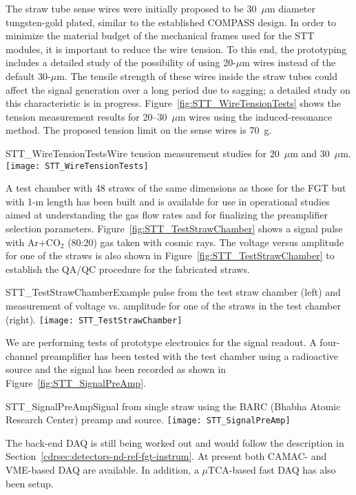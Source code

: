 The straw tube sense wires were initially proposed to be
30~$\mu$m diameter tungsten-gold plated, similar to the established
COMPASS design. In order to minimize the material
budget of the mechanical frames used for the STT modules, it is
important to reduce the wire tension. To this end, the prototyping
includes a detailed study of the possibility of using 20-$\mu$m wires
instead of the default 30-$\mu$m. The tensile strength of these wires
inside the straw tubes could affect the signal generation over a long
period due to sagging; a detailed study on this characteristic is in progress. 
Figure~\ref{fig:STT_WireTensionTests} shows the
tension measurement results for 20--30~$\mu$m wires using the induced-resonance method.  
The proposed tension limit on the sense wires is
70~g.
\begin{cdrfigure}
{STT_WireTensionTests}{Wire tension measurement studies for 20~$\mu$m and 30~$\mu$m.}
\texttt{[image: STT\_WireTensionTests]}
\end{cdrfigure}


A test chamber with 48 straws of the same dimensions as those for the FGT but
with 1-m length has been built and is available for use in operational studies aimed at understanding
the gas flow rates and for finalizing the preamplifier selection
parameters.  Figure~\ref{fig:STT_TestStrawChamber} shows
a signal pulse with Ar+CO$_2$ (80:20) gas taken with cosmic
rays. The voltage versus amplitude for one of the straws is also shown
in Figure~\ref{fig:STT_TestStrawChamber} to establish the QA/QC
procedure for the fabricated straws.
\begin{cdrfigure}
{STT_TestStrawChamber}{Example pulse from the test straw chamber (left) and
measurement of voltage vs. amplitude for one of the straws in the test chamber (right).}
\texttt{[image: STT\_TestStrawChamber]}
\end{cdrfigure}


We are performing tests of prototype electronics for the signal
readout.  A four-channel preamplifier has been tested with the test
chamber using a radioactive source and the signal has been recorded as
shown in Figure~\ref{fig:STT_SignalPreAmp}.
\begin{cdrfigure}
{STT_SignalPreAmp}{Signal from single straw using the BARC (Bhabha Atomic Research Center) preamp and source.}
\texttt{[image: STT\_SignalPreAmp]}
\end{cdrfigure}
The back-end DAQ is still being worked out and would follow the
description in Section~\ref{cdrsec:detectors-nd-ref-fgt-instrum}. At
present both CAMAC- and VME-based DAQ are available. In addition, a
$\mu$TCA-based fast DAQ has also been setup.

